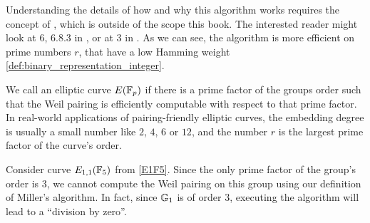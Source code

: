 Understanding the details of how and why this algorithm works requires the concept of , which is outside of the scope this book. The interested reader might look at \chaptname{} 6, \secname{} 6.8.3 in \cite{hoffstein-2008}, or at \chaptname {} 3 in \cite{costello-pairings}.  As we can see, the algorithm is more efficient on prime numbers $r$, that have a low Hamming weight \ref{def:binary_representation_integer}.

We call an elliptic curve $E(\mathbb{F}_p)$  if there is a prime factor of the groups order such that the Weil pairing is efficiently computable with respect to that prime factor. In real-world applications of pairing-friendly elliptic curves, the embedding degree is usually a small number like $2$, $4$, $6$ or $12$, and the number $r$ is the largest prime factor of the curve's order. 

\begin{example}Consider curve $E_{1,1}(\mathbb{F}_5)$ from \examplename{} \ref{E1F5}. Since the only prime factor of the group's order is $3$, we cannot compute the Weil pairing on this group using our definition of Miller's algorithm. In fact, since $\mathbb{G}_1$ is of order $3$, executing the algorithm will lead to a ``division by zero''.
\end{example}

